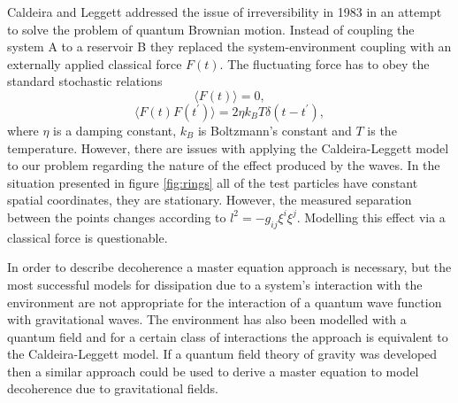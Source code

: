 Caldeira and Leggett addressed the issue of irreversibility in 1983
\cite{caldeira} in an attempt to solve the problem of quantum Brownian
motion. Instead of coupling the system A to a reservoir B they
replaced the system-environment coupling with an externally applied
classical force $F(t)$. The fluctuating force has to obey the standard
stochastic relations
\begin{equation}
\langle F(t) \rangle = 0,
\end{equation}
\begin{equation}
\langle F(t) F(t^\prime) \rangle = 2 \eta k_B T \delta (t - t^\prime),
\end{equation}
where $\eta$ is a damping constant, $k_B$ is Boltzmann's constant and
$T$ is the temperature. However, there are issues with applying the
Caldeira-Leggett model to our problem regarding the nature of the
effect produced by the waves. In the situation presented in figure
\ref{fig:rings} all of the test particles have constant spatial
coordinates, they are stationary. However, the measured separation
between the points changes according to $l^2 = -g_{ij} \xi^i
\xi^j$. Modelling this effect via a classical force is questionable.

In order to describe decoherence a master equation approach is
necessary, but the most successful models for dissipation due to a
system's interaction with the environment are not appropriate for the
interaction of a quantum wave function with gravitational waves. The
environment has also been modelled with a quantum field \cite{master}
and for a certain class of interactions the approach is equivalent to
the Caldeira-Leggett model. If a quantum field theory of gravity was
developed then a similar approach could be used to derive a master
equation to model decoherence due to gravitational fields.
